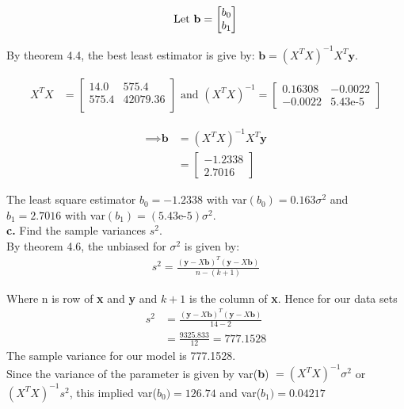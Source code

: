 \documentclass[12 pt, a4paper]{article}
\begin{document}
\[ \text{Let \textbf{b}} = 
\begin{bmatrix}
b_0 \\ b_1 
\end{bmatrix}
\]

\noindent By theorem 4.4, the best least estimator is give by: $\textbf{b}= (X^TX)^{-1}X^T\textbf{y}$. 

\begin{align*}
X^TX& = 
\begin{bmatrix}
14.0 & 575.4 \\
575.4 & 42079.36\\
\end{bmatrix} \text{ and } (X^TX)^{-1} = 
\begin{bmatrix}
0.16308 & -0.0022 \\
-0.0022 & 5.43\text{e-5}
\end{bmatrix} 
\end{align*}

\begin{align*}
\implies \textbf{b} &= (X^TX)^{-1}X^T\textbf{y} \\
&= \begin{bmatrix}
-1.2338 \\ 2.7016
\end{bmatrix}
\end{align*}

\noindent The least square estimator $b_{0}=-1.2338$ with var$(b_{0}) = 0.163 \sigma^{2}$ and $b_1=2.7016$ with var$(b_{1})=(5.43 \text{e-5})  \sigma^2$.\\


\noindent \textbf{c.} Find the sample variances $s^2$. \\

\noindent By theorem 4.6,  the unbiased for $\sigma^2$ is given by:
\begin{align*}
s^2=\frac{(\textbf{y}-X\textbf{b})^T(\textbf{y}-X\textbf{b})}{n-(k+1)}
\end{align*}

\noindent Where n is row of \textbf{x} and \textbf{y} and $k+1$ is the column of \textbf{x}. Hence for our data sets
\begin{align*}
s^2&= \frac{(\textbf{y}-X\textbf{b})^T(\textbf{y}-X\textbf{b})}{14-2}\\
& = \frac{9325.833}{12} = 777.1528
\end{align*}
The sample variance for our model is 777.1528.  \\

\noindent Since the variance of the parameter is given by var(\textbf{b}) $=(X^TX)^{-1}\sigma^2$ or $(X^TX)^{-1}s^2$,  this implied var($b_0)=126.74$ and var($b_1)=0.04217$\\
\end{document}
